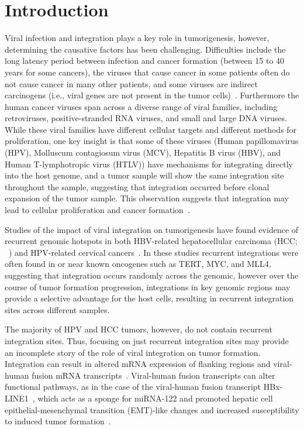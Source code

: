 \documentclass[10pt]{article}
\begin{document}
\section{Introduction}
Viral infection and integration plays a key role in tumorigenesis, however, determining the causative factors has been challenging.  Difficulties include the long latency period between infection and cancer formation (between 15 to 40 years for some cancers), the viruses that cause cancer in some patients often do not cause cancer in many other patients, and some viruses are indirect carcinogens (i.e., viral genes are not present in the tumor cells)~\cite{Hausen2009}.  Furthermore the human cancer viruses span across a diverse range of viral families, including retroviruses, positive-stranded RNA viruses, and small and large DNA viruses.  While these viral families have different cellular targets and different methods for proliferation, one key insight is that some of these viruses (Human papillomavirus (HPV), Molluscum contagiosum virus (MCV), Hepatitis B virus (HBV), and Human T-lymphotropic virus (HTLV)) have mechanisms for integrating directly into the host genome, and a tumor sample will show the same integration site throughout the sample, suggesting that integration occurred before clonal expansion of the tumor sample.  This observation suggests that integration may lead to cellular proliferation and cancer formation~\cite{Moore2010}.

Studies of the impact of viral integration on tumorigenesis have found evidence of recurrent genomic hotspots in both HBV-related hepatocellular carcinoma (HCC; ~\cite{Ding2012, Khoury2013}) and HPV-related cervical cancers~\cite{Schmitz2012}.  In these studies recurrent integrations were often found in or near known oncogenes such as TERT, MYC, and MLL4, suggesting that integration occurs randomly across the genomic, however over the course of tumor formation progression, integrations in key genomic regions may provide a selective advantage for the host cells, resulting in recurrent integration sites across different samples.  

The majority of HPV and HCC tumors, however, do not contain recurrent integration sites.  Thus, focusing on just recurrent integration sites may provide an incomplete story of the role of viral integration on tumor formation.  Integration can result in altered mRNA expression of flanking regions and viral-human fusion mRNA transcripts~\cite{Tang2013}.  Viral-human fusion transcripts can alter functional pathways, as in the case of the viral-human fusion transcript HBx-LINE1~\cite{Lau2014}, which acts as a sponge for miRNA-122 and promoted hepatic cell epithelial-mesenchymal transition (EMT)-like changes and increased susceptibility to induced tumor formation~\cite{Liang2016}.  
\end{document}
